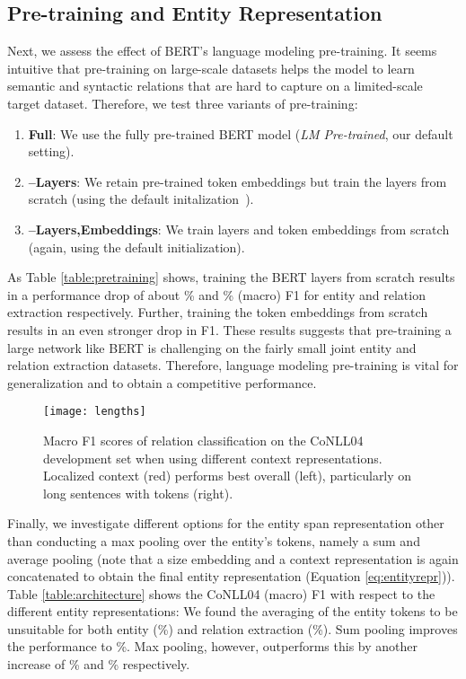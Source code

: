 \documentclass{ecai}
\begin{document}
\subsection{Pre-training and Entity Representation}

Next, we assess the effect of BERT's language modeling pre-training. It seems intuitive that pre-training on large-scale datasets helps the model to learn semantic and syntactic relations that are hard to capture on a limited-scale target dataset. Therefore, we test three variants of pre-training:
\begin{enumerate}
    \item {\bf Full}: We use the fully pre-trained BERT model (\emph{LM Pre-trained}, our default setting).
    \item {\bf --Layers}: We retain pre-trained token embeddings but train the layers from scratch (using the default initalization~\cite{devlin:2018:bert}).
    \item {\bf --Layers,Embeddings}: We train layers and token embeddings from scratch (again, using the default initialization).
\end{enumerate} 


As Table \ref{table:pretraining} shows, training the BERT layers from scratch results in a performance drop of about \% and \% (macro) F1 for entity and relation extraction respectively. Further, training the token embeddings from scratch results in an even stronger drop in F1. These results suggests that pre-training a large network like BERT is challenging on the fairly small joint entity and relation extraction datasets. Therefore, language modeling pre-training is vital for generalization and to obtain a competitive performance.


\begin{figure}[ht!]
    \centering
    \texttt{[image: lengths]}
    \caption{Macro F1 scores of relation classification on the CoNLL04 development set when using different context representations. Localized context (red) performs best overall (left), particularly on long sentences with  tokens (right).
}
        \label{fig:localized_context}
\end{figure}



Finally, we investigate different options for the entity span representation  other than conducting a max pooling over the entity's tokens, namely a sum and average pooling (note that a size embedding and a context representation is again concatenated to obtain the final entity representation (Equation \ref{eq:entityrepr})).
Table \ref{table:architecture} shows the CoNLL04 (macro) F1 with respect to the different entity representations: We found the averaging of the entity tokens to be unsuitable for both entity (\%) and relation extraction (\%). Sum pooling improves the performance to \%. Max pooling, however, outperforms this by another increase of \% and \% respectively.
\end{document}
